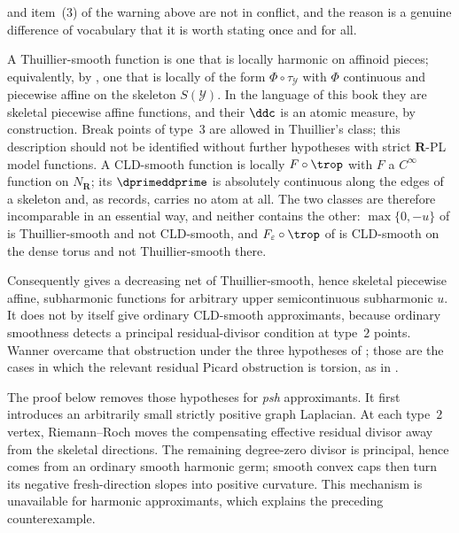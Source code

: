 \begin{remark}
\label{rem:ch19-thuillier-smooth-vs-cld}
 and item~(3) of the warning above are
not in conflict, and the reason is a genuine difference of vocabulary that it
is worth stating once and for all.

A Thuillier-smooth function is one that is locally harmonic on affinoid
pieces; equivalently, by \cite[Prop.~3.2.4]{Thu05}, one that is locally of
the form $\Phi\circ\tau_{\mathcal Y}$ with $\Phi$ continuous and
piecewise affine on the skeleton $S(\mathcal Y)$.  In the language of this
book they are skeletal piecewise affine functions, and their $\ddc$ is
an atomic measure, by construction.  Break points of type~$3$ are allowed
in Thuillier's class; this description should not be identified without
further hypotheses with strict $\mathbf R$-PL model functions.  A
CLD-smooth function is locally $F\circ\trop$ with $F$ a $C^\infty$
function on $N_{\mathbf R}$; its $\dprimeddprime$ is absolutely
continuous along the edges of a skeleton and, as 
records, carries no atom at all.  The two classes are therefore
incomparable in an essential way, and neither contains the other:
$\max\{0,-u\}$ of  is Thuillier-smooth and not
CLD-smooth, and $F_\varepsilon\circ\trop$ of  is
CLD-smooth on the dense torus and not Thuillier-smooth there.

Consequently  gives a decreasing net
of Thuillier-smooth, hence skeletal piecewise affine, subharmonic functions
for arbitrary upper semicontinuous subharmonic $u$.  It does not by itself
give ordinary CLD-smooth approximants, because ordinary smoothness detects a
principal residual-divisor condition at type~$2$ points.  Wanner overcame
that obstruction under the three hypotheses of
\cite[Cor.~5.4]{Wanner19}; those are the cases in which the relevant
residual Picard obstruction is torsion, as in
\cite[Thm.~2.3.21]{Thu05}.

The proof below removes those hypotheses for \emph{psh} approximants.  It
first introduces an arbitrarily small strictly positive graph Laplacian.
At each type~$2$ vertex, Riemann--Roch moves the compensating effective
residual divisor away from the skeletal directions.  The remaining
degree-zero divisor is principal, hence comes from an ordinary smooth
harmonic germ; smooth convex caps then turn its negative fresh-direction
slopes into positive curvature.  This mechanism is unavailable for harmonic
approximants, which explains the preceding counterexample.
\end{remark}

